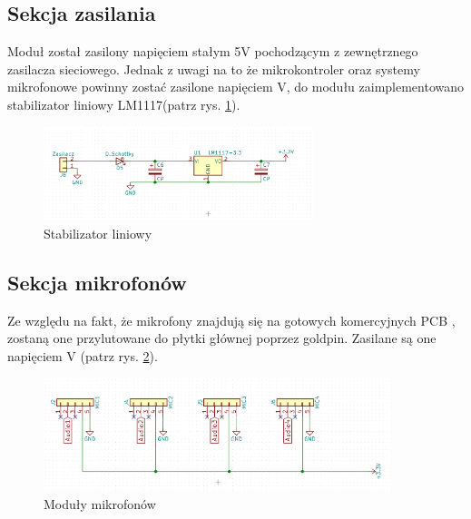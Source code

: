 \documentclass[eng,printmode]{mgr}
\begin{document}
\subsection{Sekcja zasilania}
Moduł został zasilony napięciem stałym 5V pochodzącym z zewnętrznego zasilacza sieciowego. Jednak z uwagi na to że mikrokontroler oraz systemy  mikrofonowe powinny zostać zasilone napięciem \unit[3,3]{V}, do modułu zaimplementowano stabilizator liniowy LM1117(patrz rys. \ref{fig-stabilizator}).
\begin{figure}[ht]

    \centering

  \includegraphics[width=0.7\textwidth, angle=0]{zasilanie.png}

    \caption{Stabilizator liniowy}
 \label{fig-stabilizator}
    

\end{figure}



\subsection{Sekcja mikrofonów}
Ze względu na fakt, że mikrofony znajdują się na gotowych komercyjnych PCB , zostaną one przylutowane do płytki głównej poprzez goldpin. Zasilane są one napięciem \unit[3,3]{V} (patrz rys. \ref{fig-mikrofony}).
\begin{figure}[ht]

    \centering

  \includegraphics[width=0.9\textwidth, angle=0]{mikrofony.png}

    \caption{Moduły mikrofonów}
 \label{fig-mikrofony}
    

\end{figure}
\end{document}
